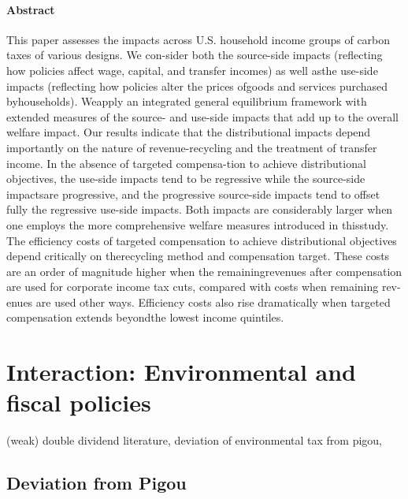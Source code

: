 \documentclass[12pt]{article}
\begin{document}
\paragraph{Abstract}
This paper assesses the impacts across U.S. household income groups of carbon taxes of various designs. We con-sider both the source-side impacts (reflecting how policies affect wage, capital, and transfer incomes) as well asthe use-side impacts (reflecting how policies alter the prices ofgoods and services purchased byhouseholds). Weapply an integrated general equilibrium framework with extended measures of the source- and use-side impacts that add up to the overall welfare impact. Our results indicate that the distributional impacts depend importantly on the nature of revenue-recycling and the treatment of transfer income. In the absence of targeted compensa-tion to achieve distributional objectives, the use-side impacts tend to be regressive while the source-side impactsare progressive, and the progressive source-side impacts tend to offset fully the regressive use-side impacts. Both impacts are considerably larger when one employs the more comprehensive welfare measures introduced in thisstudy. The efficiency costs of targeted compensation to achieve distributional objectives depend critically on therecycling method and compensation target. These costs are an order of magnitude higher when the remainingrevenues after compensation are used for corporate income tax cuts, compared with costs when remaining rev-enues are used other ways. Efficiency costs also rise dramatically when targeted compensation extends beyondthe lowest income quintiles.
\section{Interaction: Environmental and fiscal policies}
(weak) double dividend literature, deviation of environmental tax from pigou, 
\subsection{Deviation from Pigou}
\subsubsection{\cite{LansBovenberg1994EnvironmentalTaxation}}
\subsubsection{\cite{Barrage2019OptimalPolicy}}
\end{document}
